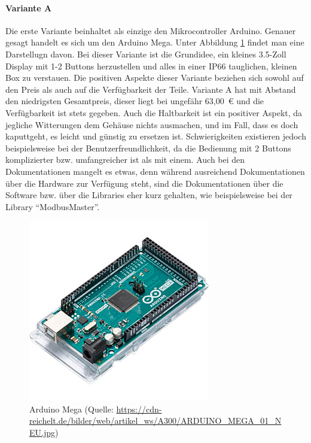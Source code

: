 \paragraph{Variante A}
Die erste Variante beinhaltet als einzige den Mikrocontroller Arduino. Genauer gesagt handelt es sich um den Arduino Mega. Unter Abbildung \ref{fig:arduino_mega} findet man eine Darstellugn davon. Bei dieser Variante ist die Grundidee, ein kleines 3.5-Zoll Display mit 1-2 Buttons herzustellen und alles in einer IP66 tauglichen, kleinen Box zu verstauen. 
Die positiven Aspekte dieser Variante beziehen sich sowohl auf den Preis als auch auf die Verfügbarkeit der Teile. Variante A hat mit Abstand den niedrigsten Gesamtpreis, dieser liegt bei ungefähr 63,00 € und die Verfügbarkeit ist stets gegeben. Auch die Haltbarkeit ist ein positiver Aspekt, da jegliche Witterungen dem Gehäuse nichts ausmachen, und im Fall, dass es doch kaputtgeht, es leicht und günstig zu ersetzen ist. Schwierigkeiten existieren jedoch beispielsweise bei der Benutzerfreundlichkeit, da die Bedienung mit 2 Buttons komplizierter bzw. umfangreicher ist als mit einem. Auch bei den Dokumentationen mangelt es etwas, denn während ausreichend Dokumentationen über die Hardware zur Verfügung steht, sind die Dokumentationen über die Software bzw. über die Libraries eher kurz gehalten, wie beispielsweise bei der Library \enquote{ModbusMaster}.
\begin{figure}[ht]
	\centering
	\includegraphics[width=0.5\linewidth]{Bilder/ARDUINO_MEGA.jpg}
	\caption{Arduino Mega (Quelle: \url{https://cdn-reichelt.de/bilder/web/artikel_ws/A300/ARDUINO_MEGA_01_NEU.jpg})}
	\label{fig:arduino_mega}
\end{figure}
